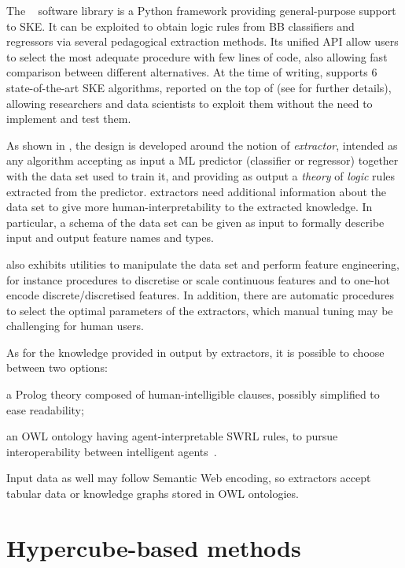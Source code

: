 \documentclass[
]{ceurart}
\begin{document}


The \psyke{}~\cite{psyke-woa2021,psyke-ia2022} software library is a Python framework providing general-purpose support to SKE.
%
It can be exploited to obtain logic rules from BB classifiers and regressors via several pedagogical extraction methods.
%
Its unified API allow users to select the most adequate procedure with few lines of code, also allowing fast comparison between different alternatives.
%
At the time of writing, \psyke{} supports 6 state-of-the-art SKE algorithms, reported on the top of  (see  for further details), allowing researchers and data scientists to exploit them without the need to implement and test them.

As shown in , the \psyke{} design is developed around the notion of \emph{extractor}, intended as any algorithm accepting as input a ML predictor (classifier or regressor) together with the data set used to train it, and providing as output a \emph{theory} of \emph{logic} rules extracted from the predictor.
%
\psyke{} extractors need additional information about the data set to give more human-interpretability to the extracted knowledge.
In particular, a schema of the data set can be given as input to formally describe input and output feature names and types.

\psyke{} also exhibits utilities to manipulate the data set and perform feature engineering, for instance procedures to discretise or scale continuous features and to one-hot encode discrete/discretised features.
%
In addition, there are automatic procedures to select the optimal parameters of the extractors, which manual tuning may be challenging for human users.

As for the knowledge provided in output by extractors, it is possible to choose between two options:
\begin{inlinelist}
	\item a Prolog theory composed of human-intelligible clauses, possibly simplified to ease readability;
	\item an OWL ontology having agent-interpretable SWRL rules, to pursue interoperability between intelligent agents~\cite{psyke-extraamas2022}.
\end{inlinelist}
%
Input data as well may follow Semantic Web encoding, so \psyke{} extractors accept tabular data or knowledge graphs stored in OWL ontologies.

\section{Hypercube-based methods}\label{sec:contribution}
\end{document}
